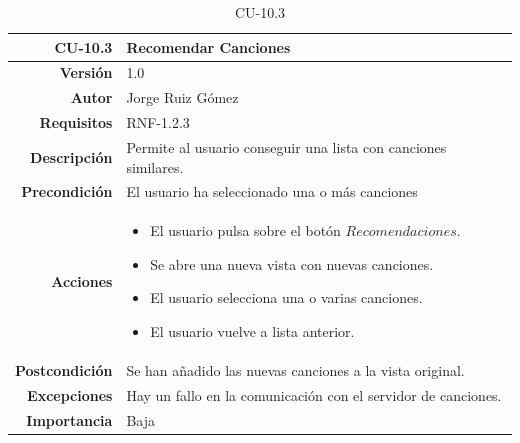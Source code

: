 \begin{table}[H]
    \centering
    \begin{tabular}{r|p{}}
    \hline
    \textbf{CU-10.3}  & \textbf{Recomendar Canciones}                                 \\ \hline
    \textbf{Versión}       & 1.0                                                     \\
    \textbf{Autor}         & Jorge Ruiz Gómez                                        \\
    \textbf{Requisitos}    & RNF-1.2.3                                         \\
    \textbf{Descripción}   & Permite al usuario conseguir una lista con canciones similares. \\ \hline
    \textbf{Precondición}  & El usuario ha seleccionado una o más canciones\\
    \textbf{Acciones}      &    \begin{itemize}
                                    \item El usuario pulsa sobre el botón $Recomendaciones$.
                                    \item Se abre una nueva vista con nuevas canciones.
                                    \item El usuario selecciona una o varias canciones.
                                    \item El usuario vuelve a lista anterior.
                                \end{itemize}\\
                                                                              
    \textbf{Postcondición} & Se han añadido las nuevas canciones a la vista original. \\
    \textbf{Excepciones}   & Hay un fallo en la comunicación con el servidor de canciones.                                                 \\
    \textbf{Importancia}   & Baja                                                    \\ \hline
    \end{tabular}
    \caption{CU-10.3}
    \label{tab:CUT-10.3}
\end{table}



